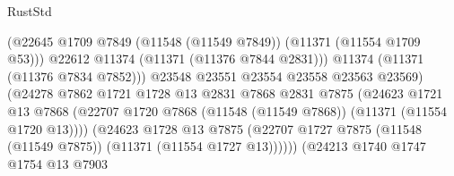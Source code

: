 \begin{lexlean}{RustStd}
\begin{coremodule}
                                              (@22645
                                                @1709
                                                @7849
                                                (@11548 (@11549 @7849))
                                                (@11371 (@11554 @1709 @53)))
                                              @22612
                                              @11374
                                              (@11371 (@11376 @7844 @2831)))
                                            @11374
                                            (@11371 (@11376 @7834 @7852)))
                                          @23548
                                          @23551
                                          @23554
                                          @23558
                                          @23563
                                          @23569)
                                        (@24278
                                          @7862
                                          @1721
                                          @1728
                                          @13
                                          @2831
                                          @7868
                                          @2831
                                          @7875
                                          (@24623
                                            @1721
                                            @13
                                            @7868
                                            (@22707
                                              @1720
                                              @7868
                                              (@11548 (@11549 @7868))
                                              (@11371 (@11554 @1720 @13))))
                                          (@24623
                                            @1728
                                            @13
                                            @7875
                                            (@22707
                                              @1727
                                              @7875
                                              (@11548 (@11549 @7875))
                                              (@11371 (@11554 @1727 @13))))))
                                      (@24213
                                        @1740
                                        @1747
                                        @1754
                                        @13
                                        @7903

\end{coremodule}
\end{lexlean}
